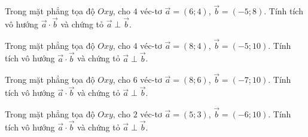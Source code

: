 \begin{bt}%
	Trong mặt phẳng tọa độ $Oxy$, cho $4$ véc-tơ $\overrightarrow{a}=(6;4)$, $\overrightarrow{b}=(-5;8)$. Tính tích vô hướng $\overrightarrow{a}\cdot \overrightarrow{b}$ và chứng tỏ $\overrightarrow{a}\perp\overrightarrow{b}$.
\end{bt}

\begin{bt}%
	Trong mặt phẳng tọa độ $Oxy$, cho $4$ véc-tơ $\overrightarrow{a}=(8;4)$, $\overrightarrow{b}=(-5;10)$. Tính tích vô hướng $\overrightarrow{a}\cdot \overrightarrow{b}$ và chứng tỏ $\overrightarrow{a}\perp\overrightarrow{b}$.
\end{bt}

\begin{bt}%
	Trong mặt phẳng tọa độ $Oxy$, cho $6$ véc-tơ $\overrightarrow{a}=(8;6)$, $\overrightarrow{b}=(-7;10)$. Tính tích vô hướng $\overrightarrow{a}\cdot \overrightarrow{b}$ và chứng tỏ $\overrightarrow{a}\perp\overrightarrow{b}$.
\end{bt}

\begin{bt}%
Trong mặt phẳng tọa độ $Oxy$, cho $2$ véc-tơ $\overrightarrow{a}=(5;3)$, $\overrightarrow{b}=(-6;10)$. Tính tích vô hướng $\overrightarrow{a}\cdot \overrightarrow{b}$ và chứng tỏ $\overrightarrow{a}\perp\overrightarrow{b}$.
\end{bt}


